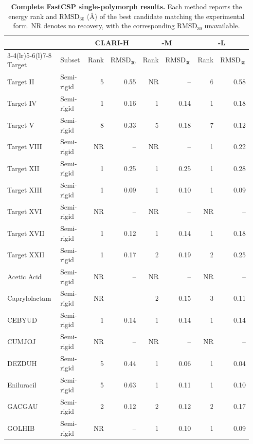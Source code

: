 \begin{table}[H]
\centering
\small
\caption{\textbf{Complete FastCSP single-polymorph results.}
Each method reports the energy rank and $\mathrm{RMSD}_{30}$ (\AA) of the
best candidate matching the experimental form. NR denotes no recovery, with
the corresponding $\mathrm{RMSD}_{30}$ unavailable.}
\label{tab:fastcsp-single-ranking-details}

\footnotesize
\setlength{\tabcolsep}{4pt}
\renewcommand{\arraystretch}{1.05}

\begin{tabular}{@{}llrrrrrr@{}}
\toprule
& & \multicolumn{2}{c}{CLARI-H}
& \multicolumn{2}{c}{\model{}-M}
& \multicolumn{2}{c}{\model{}-L} \\
\cmidrule(lr){3-4}\cmidrule(lr){5-6}\cmidrule(l){7-8}
Target & Subset
& Rank & $\mathrm{RMSD}_{30}$
& Rank & $\mathrm{RMSD}_{30}$
& Rank & $\mathrm{RMSD}_{30}$ \\
\midrule
Target II & Semi-rigid & 5 & 0.55 & NR & -- & 6 & 0.58 \\
Target IV & Semi-rigid & 1 & 0.16 & 1 & 0.14 & 1 & 0.18 \\
Target V & Semi-rigid & 8 & 0.33 & 5 & 0.18 & 7 & 0.12 \\
Target VIII & Semi-rigid & NR & -- & NR & -- & 1 & 0.22 \\
Target XII & Semi-rigid & 1 & 0.25 & 1 & 0.25 & 1 & 0.28 \\
Target XIII & Semi-rigid & 1 & 0.09 & 1 & 0.10 & 1 & 0.09 \\
Target XVI & Semi-rigid & NR & -- & NR & -- & NR & -- \\
Target XVII & Semi-rigid & 1 & 0.12 & 1 & 0.14 & 1 & 0.18 \\
Target XXII & Semi-rigid & 1 & 0.17 & 2 & 0.19 & 2 & 0.25 \\
Acetic Acid & Semi-rigid & NR & -- & NR & -- & NR & -- \\
Caprylolactam & Semi-rigid & NR & -- & 2 & 0.15 & 3 & 0.11 \\
CEBYUD & Semi-rigid & 1 & 0.14 & 1 & 0.14 & 1 & 0.14 \\
CUMJOJ & Semi-rigid & NR & -- & NR & -- & NR & -- \\
DEZDUH & Semi-rigid & 5 & 0.44 & 1 & 0.06 & 1 & 0.04 \\
Eniluracil & Semi-rigid & 5 & 0.63 & 1 & 0.11 & 1 & 0.10 \\
GACGAU & Semi-rigid & 2 & 0.12 & 2 & 0.12 & 2 & 0.17 \\
GOLHIB & Semi-rigid & NR & -- & 1 & 0.10 & 1 & 0.09 \\

\end{tabular}
\end{table}

